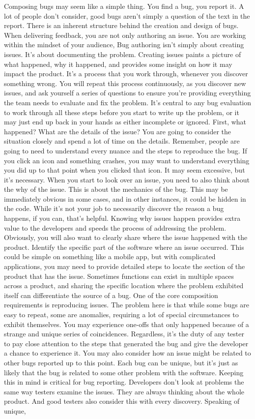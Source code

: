 Composing bugs may seem like a simple thing. You find a bug, you report it. A lot of people don't consider, good bugs aren't simply a question of the text in the report. There is an inherent structure behind the creation and design of bugs. When delivering feedback, you are not only authoring an issue. You are working within the mindset of your audience, Bug authoring isn't simply about creating issues. It's about documenting the problem. Creating issues paints a picture of what happened, why it happened, and provides some insight on how it may impact the product. It's a process that you work through, whenever you discover something wrong. You will repeat this process continuously, as you discover new issues, and ask yourself a series of questions to ensure you're providing everything the team needs to evaluate and fix the problem. It's central to any bug evaluation to work through all these steps before you start to write up the problem, or it may just end up back in your hands as either incomplete or ignored. First, what happened? What are the details of the issue? You are going to consider the situation closely and spend a lot of time on the details. Remember, people are going to need to understand every nuance and the steps to reproduce the bug. If you click an icon and something crashes, you may want to understand everything you did up to that point when you clicked that icon. It may seem excessive, but it's necessary. When you start to look over an issue, you need to also think about the why of the issue. This is about the mechanics of the bug. This may be immediately obvious in some cases, and in other instances, it could be hidden in the code. While it's not your job to necessarily discover the reason a bug happens, if you can, that's helpful. Knowing why issues happen provides extra value to the developers and speeds the process of addressing the problem. Obviously, you will also want to clearly share where the issue happened with the product. Identify the specific part of the software where an issue occurred. This could be simple on something like a mobile app, but with complicated applications, you may need to provide detailed steps to locate the section of the product that has the issue. Sometimes functions can exist in multiple spaces across a product, and sharing the specific location where the problem exhibited itself can differentiate the source of a bug. One of the core composition requirements is reproducing issues. The problem here is that while some bugs are easy to repeat, some are anomalies, requiring a lot of special circumstances to exhibit themselves. You may experience one-offs that only happened because of a strange and unique series of coincidences. Regardless, it's the duty of any tester to pay close attention to the steps that generated the bug and give the developer a chance to experience it. You may also consider how an issue might be related to other bugs reported up to this point. Each bug can be unique, but it's just as likely that the bug is related to some other problem with the software. Keeping this in mind is critical for bug reporting. Developers don't look at problems the same way testers examine the issues. They are always thinking about the whole product. And good testers also consider this with every discovery. Speaking of unique, 